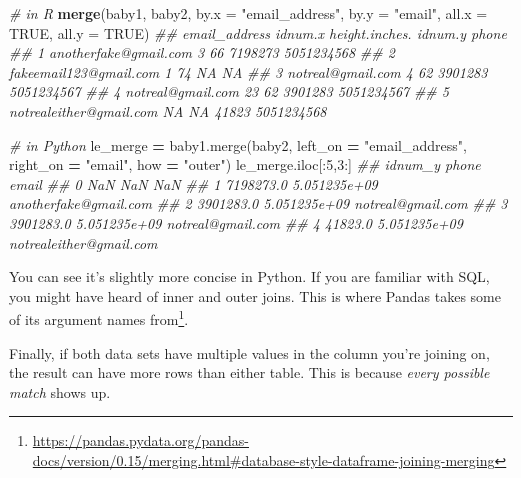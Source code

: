\documentclass[12pt,krantz2]{krantz}
\makeatletter
\newenvironment{Shaded}{\begin{snugshade}}{\end{snugshade}}
\newcommand{\CommentTok}[1]{\textcolor[rgb]{0.37,0.37,0.37}{\textit{#1}}}
\newcommand{\DataTypeTok}[1]{\textcolor[rgb]{0.27,0.27,0.27}{#1}}
\newcommand{\DecValTok}[1]{\textcolor[rgb]{0.06,0.06,0.06}{#1}}
\newcommand{\KeywordTok}[1]{\textcolor[rgb]{0.27,0.27,0.27}{\textbf{#1}}}
\newcommand{\NormalTok}[1]{#1}
\newcommand{\OperatorTok}[1]{\textcolor[rgb]{0.43,0.43,0.43}{\textbf{#1}}}
\newcommand{\OtherTok}[1]{\textcolor[rgb]{0.37,0.37,0.37}{#1}}
\newcommand{\StringTok}[1]{\textcolor[rgb]{0.5,0.5,0.5}{#1}}
\renewcommand{\href}[2]{#2\footnote{\url{#1}}}
\newenvironment{kframe}{%
\medskip{}
\setlength{\fboxsep}{.8em}
 \def\at@end@of@kframe{}%
 \ifinner\ifhmode%
  \def\at@end@of@kframe{\end{minipage}}%
  \begin{minipage}{\columnwidth}%
 \fi\fi%
 \def\FrameCommand##1{\hskip\@totalleftmargin \hskip-\fboxsep
 \colorbox{shadecolor}{##1}\hskip-\fboxsep
     \hskip-\linewidth \hskip-\@totalleftmargin \hskip\columnwidth}%
 \MakeFramed {\advance\hsize-\width
   \@totalleftmargin\z@ \linewidth\hsize
   \@setminipage}}%
 {\par\unskip\endMakeFramed%
 \at@end@of@kframe}
\renewenvironment{Shaded}{\begin{kframe}}{\end{kframe}}
\makeatother
\begin{document}
\begin{Shaded}
\begin{Highlighting}[]
\CommentTok{# in R}
\KeywordTok{merge}\NormalTok{(baby1, baby2, }
      \DataTypeTok{by.x =} \StringTok{"email_address"}\NormalTok{, }\DataTypeTok{by.y =} \StringTok{"email"}\NormalTok{, }
      \DataTypeTok{all.x =} \OtherTok{TRUE}\NormalTok{, }\DataTypeTok{all.y =} \OtherTok{TRUE}\NormalTok{)}
\CommentTok{##             email_address idnum.x height.inches. idnum.y      phone}
\CommentTok{## 1   anotherfake@gmail.com       3             66 7198273 5051234568}
\CommentTok{## 2  fakeemail123@gmail.com       1             74      NA         NA}
\CommentTok{## 3       notreal@gmail.com       4             62 3901283 5051234567}
\CommentTok{## 4       notreal@gmail.com      23             62 3901283 5051234567}
\CommentTok{## 5 notrealeither@gmail.com      NA             NA   41823 5051234568}
\end{Highlighting}
\end{Shaded}

\begin{Shaded}
\begin{Highlighting}[]
\CommentTok{# in Python}
\NormalTok{le_merge }\OperatorTok{=}\NormalTok{ baby1.merge(baby2, }
\NormalTok{                       left_on }\OperatorTok{=} \StringTok{"email_address"}\NormalTok{, right_on }\OperatorTok{=} \StringTok{"email"}\NormalTok{, }
\NormalTok{                       how }\OperatorTok{=} \StringTok{"outer"}\NormalTok{)}
\NormalTok{le_merge.iloc[:}\DecValTok{5}\NormalTok{,}\DecValTok{3}\NormalTok{:]}
\CommentTok{##      idnum_y         phone                    email}
\CommentTok{## 0        NaN           NaN                      NaN}
\CommentTok{## 1  7198273.0  5.051235e+09    anotherfake@gmail.com}
\CommentTok{## 2  3901283.0  5.051235e+09        notreal@gmail.com}
\CommentTok{## 3  3901283.0  5.051235e+09        notreal@gmail.com}
\CommentTok{## 4    41823.0  5.051235e+09  notrealeither@gmail.com}
\end{Highlighting}
\end{Shaded}

You can see it's slightly more concise in Python. If you are familiar with SQL, you might have heard of inner and outer joins. This is where Pandas \href{https://pandas.pydata.org/pandas-docs/version/0.15/merging.html\#database-style-dataframe-joining-merging}{takes some of its argument names from}.

Finally, if both data sets have multiple values in the column you're joining on, the result can have more rows than either table. This is because \emph{every possible match} shows up.
\end{document}
